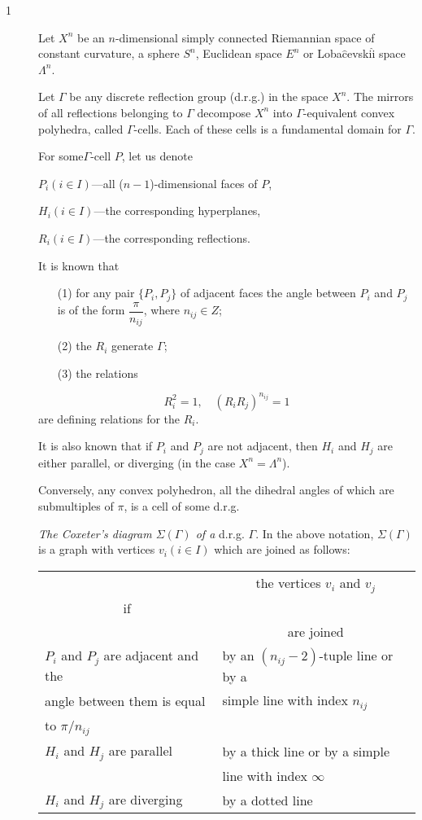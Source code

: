\begin{description}
\item[1] Let $X^n$ be an $n$-dimensional simply connected Riemannian space of constant curvature, \ie a sphere $S^n$, Euclidean space $E^n$ or Loba$\hat{\text{c}}$evski$\hat{\text{i}}$ space $\Lambda^n$.

Let $\Gamma$ be any discrete reflection group (d.r.g.) in the space $X^n$. The mirrors of all reflections belonging to $\Gamma$ decompose $X^n$ into $\Gamma$-equivalent convex polyhedra, called $\Gamma$-cells. Each of these cells is a fundamental domain for $\Gamma$.
 
For some\pageoriginale $\Gamma$-cell $P$, let us denote

$P_i (i \in I)$---all ($n-1$)-dimensional faces of $P$,

$H_i(i \in I)$---the corresponding hyperplanes,

$R_i(i \in I)$---the corresponding reflections.

It is known that 
\begin{itemize}
\item[(1)] for any pair $\{P_i, P_j\}$ of adjacent faces the angle between $P_i$ and $P_j$ is of the form $\dfrac{\pi}{n_{ij}}$, where $n_{ij} \in Z$;

\item[(2)] the $R_i$ generate $\Gamma$;

\item[(3)] the relations 
\end{itemize}
$$
R^2_i = 1, \quad (R_i R_j)^{n_{ij}} =1
$$
are defining relations for the $R_i$.

It is also known \cite{art10-key9, art10-key10} that if $P_i$ and $P_j$ are not adjacent, then $H_i$ and $H_j$ are either parallel, or diverging (in the case $X^n = \Lambda^n$).

Conversely, any convex polyhedron, all the dihedral angles of which are submultiples of $\pi$, is a cell of some d.r.g.

\textit{The Coxeter's diagram $\Sigma (\Gamma)$ of a} d.r.g. $\Gamma$. In the above notation, $\Sigma (\Gamma)$ is a graph with vertices $v_i (i \in I)$ which are joined as follows:
{
\tabcolsep=3pt
\setcounter{table}{0}
\begin{longtable}{@{}l|l@{}}
\hline
&  \multicolumn{1}{c}{the vertices $v_i$ and $v_j$} \\[-0.4cm]
\multicolumn{1}{c|}{if} & \\
& \multicolumn{1}{c}{are joined} \\\hline
$P_i$ and $P_j$ are adjacent and the & by an $(n_{ij}-2)$-tuple line or by a \\
angle between them is equal  & simple line with index $n_{ij}$\\
to $\pi / n_{ij}$ & \\\hline
$H_i$ and $H_j$ are parallel & by a thick line or by a simple\\
& line with index $\infty$\\\hline
$H_i$ and $H_j$ are diverging & by a dotted line\\\hline
\end{longtable}}\relax


\end{description}

